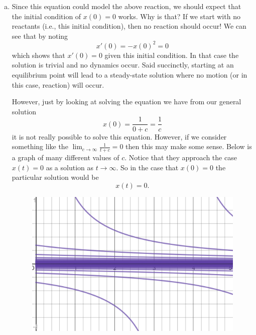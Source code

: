 \documentclass[12pt]{article} %
\begin{document}
\begin{solution}
\begin{enumerate}[(a)]
\item Since this equation could model the above reaction, we should expect that the initial condition of $x(0)=0$ works. Why is that? If we start with no reactants (i.e., this initial condition), then no reaction should occur!  We can see that by noting
\[
x'(0)=-x(0)^2=0
\]
which shows that $x'(0)=0$ given this initial condition.  In that case the solution is trivial and no dynamics occur. Said succinctly, starting at an equilibrium point will lead to a steady-state solution where no motion (or in this case, reaction) will occur.

However, just by looking at solving the equation we have from our general solution
\[
x(0)=\frac{1}{0+c}=\frac{1}{c}
\]
it is not really possible to solve this equation. However, if we consider something like the $\lim_{c\to \infty} \frac{1}{t+c}=0$ then this may make some sense.  Below is a graph of many different values of $c$. Notice that they approach the case $x(t)=0$ as a solution as $t\to \infty$. So in the case that $x(0)=0$ the particular solution would be
\[
\boxed{x(t)=0.}
\]
\begin{figure}[H]
    \centering
    \includegraphics[width=\textwidth]{2nd_order_chem.png}
\end{figure}
\end{enumerate}
\end{solution}
\end{document}
